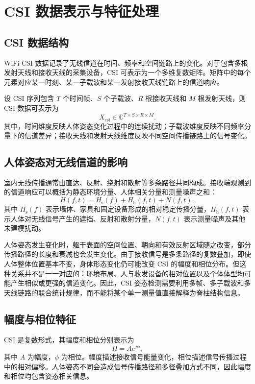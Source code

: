 ﻿%

\chapter{CSI 数据表示与特征处理}
\label{chap:features}

\section{CSI 数据结构}
WiFi CSI 数据记录了无线信道在时间、频率和空间链路上的变化。对于包含多根发射天线和接收天线的采集设备，CSI 可表示为一个多维复数矩阵。矩阵中的每个元素对应某一时刻、某一子载波和某一发射接收天线链路上的信道响应。

设 CSI 序列包含 $T$ 个时间帧、$S$ 个子载波、$R$ 根接收天线和 $M$ 根发射天线，则 CSI 数据可表示为
\begin{equation}
X_{\mathrm{csi}}\in \mathbb{C}^{T\times S\times R\times M}.
\end{equation}
其中，时间维度反映人体姿态变化过程中的连续扰动；子载波维度反映不同频率分量下的信道差异；接收天线和发射天线维度反映不同空间传播链路上的信号变化。

\section{人体姿态对无线信道的影响}
室内无线传播通常由直达、反射、绕射和散射等多条路径共同构成。接收端观测到的信道响应可以概括为静态环境分量、人体相关分量和测量噪声之和：
\begin{equation}
H(f,t)=H_{\mathrm{s}}(f)+H_{\mathrm{h}}(f,t)+N(f,t),
\end{equation}
其中 $H_{\mathrm{s}}(f)$ 表示墙体、家具和固定设备形成的相对稳定传播分量，$H_{\mathrm{h}}(f,t)$ 表示人体对无线信号产生的遮挡、反射和散射分量，$N(f,t)$ 表示测量噪声及其他未建模扰动。

人体姿态发生变化时，躯干表面的空间位置、朝向和有效反射区域随之改变，部分传播路径的长度和衰减也会发生变化。由于接收信号是多条路径的复数叠加，即使人体整体位置基本不变，身体形态变化仍可能改变 CSI 的幅度和相位分布。但这种关系并不是一一对应的：环境布局、人与收发设备的相对位置以及个体体型均可能产生相似或更强的信道变化。因此，CSI 姿态检测需要利用多帧、多子载波和多天线链路的联合统计规律，而不能将某个单一测量值直接解释为脊柱结构信息。

\section{幅度与相位特征}
CSI 是复数形式，其幅度和相位分别表示为
\begin{equation}
H=Ae^{j\phi},
\end{equation}
其中 $A$ 为幅度，$\phi$ 为相位。幅度描述接收信号能量变化，相位描述信号传播过程中的相对偏移。人体姿态不同会造成信号传播路径和多径叠加方式不同，因此幅度和相位均包含姿态相关信息。

